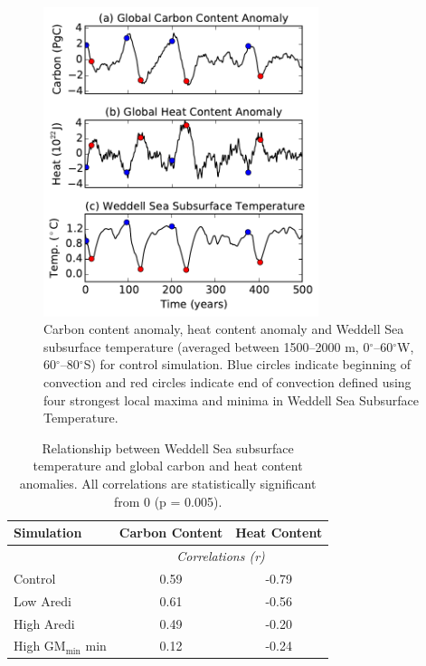 \begin{figure}
\centering
\includegraphics[width=19pc]{figure4.pdf}
\caption{Carbon content anomaly, heat content anomaly and Weddell Sea subsurface
temperature (averaged between 1500--2000 m, 0$^{\circ}$--60$^{\circ}$W,
60$^{\circ}$--80$^{\circ}$S) for control simulation. Blue circles indicate
beginning of convection and red circles indicate end of convection defined using
four strongest local maxima and minima in Weddell Sea Subsurface Temperature.}
\label{fig:heat_carbon_convection}
\end{figure}


\begin{table}[h]
\caption{Relationship between Weddell Sea subsurface temperature and global carbon
and heat content anomalies. All correlations are statistically significant from
0 (p = 0.005).}\label{t1}
\begin{center}
\begin{tabular}{lcc}
\hline
Simulation              & Carbon Content & Heat Content \\
\hline
 & \multicolumn{2}{c}{\textit{Correlations (r)}} \\
Control & 0.59 & -0.79   \\
Low Aredi & 0.61 & -0.56  \\
High Aredi & 0.49 & -0.20 \\
High GM$_{\mathrm{min}}$ min     & 0.12 & -0.24   \\
\end{tabular}
\end{center}
\end{table}

